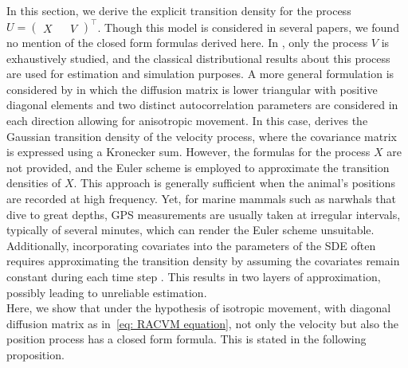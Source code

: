 \documentclass[aoas]{imsart}
\theoremstyle{definition}
\theoremstyle{remark}
\theoremstyle{remark}
\newcommand {\1}{\mathbb{1}}
\begin{document}
In this section, we derive the explicit transition density for the process $U=\begin{pmatrix} X && V \end{pmatrix}^\top$. Though this model is considered in several papers, we found no mention of the closed form formulas derived here. In \cite{gurarie_correlated_2017}, only the process $V$ is exhaustively studied, and the classical distributional results about this process are used for estimation and simulation purposes.
A more general formulation is considered by \cite{albertsen_generalizing_2018} in which the diffusion matrix is lower triangular with positive diagonal elements and two distinct autocorrelation parameters are considered in each direction allowing for anisotropic movement. In this case, \cite{albertsen_generalizing_2018} derives the Gaussian transition density of the velocity process, where the covariance matrix is expressed using a Kronecker sum. However, the formulas for the process $X$
are not provided, and the Euler scheme is employed to approximate the transition densities of $X$. This approach is generally sufficient when the animal’s positions are recorded at high frequency. Yet, for marine mammals such as narwhals that dive to great depths, GPS measurements are usually taken at irregular intervals, typically of several minutes, which can render the Euler scheme unsuitable. Additionally, incorporating covariates into the parameters of the SDE often requires approximating the transition density by assuming the covariates remain constant during each time step \citep{michelot_varying-coefficient_2021}. This results in two layers of approximation, possibly leading to unreliable estimation.\\

Here, we show that under the hypothesis of isotropic movement, with diagonal diffusion matrix as in~\eqref{eq: RACVM equation}, not only the velocity but also the position process has a closed form formula. This is stated in the following proposition.\\
\end{document}
